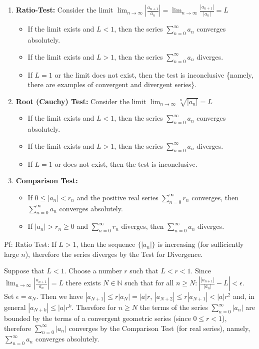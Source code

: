 \documentclass{article}
\begin{document}
\begin{enumerate}
    \item \textbf{Ratio-Test:} Consider the limit $\lim_{n \to \infty} \left| \frac{a_{n+1}}{a_n} \right| = \lim_{n \to \infty} \frac{|a_{n+1}|}{|a_n|} = L$
    \begin{itemize}
        \item If the limit exists and $L < 1$, then the series $\sum_{n=0}^{\infty} a_n$ converges absolutely.
        \item If the limit exists and $L > 1$, then the series $\sum_{n=0}^{\infty} a_n$ diverges.
        \item If $L = 1$ or the limit does not exist, then the test is inconclusive \{namely, there are examples of convergent and divergent series\}.
    \end{itemize}
    \item \textbf{Root (Cauchy) Test:} Consider the limit $\lim_{n \to \infty} \sqrt[n]{|a_n|} = L$
    \begin{itemize}
        \item If the limit exists and $L < 1$, then the series $\sum_{n=0}^{\infty} a_n$ converges absolutely.
        \item If the limit exists and $L > 1$, then the series $\sum_{n=0}^{\infty} a_n$ diverges.
        \item If $L = 1$ or does not exist, then the test is inconclusive.
    \end{itemize}
    \item \textbf{Comparison Test:}
    \begin{itemize}
        \item If $0 \leq |a_n| < r_n$ and the positive real series $\sum_{n=0}^{\infty} r_n$ converges, then $\sum_{n=0}^{\infty} a_n$ converges absolutely.
        \item If $|a_n| > r_n \geq 0$ and $\sum_{n=0}^{\infty} r_n$ diverges, then $\sum_{n=0}^{\infty} a_n$ diverges.
    \end{itemize}

\end{enumerate}

Pf: Ratio Test: If $L > 1$, then the sequence $\{|a_n|\}$ is increasing (for sufficiently large $n$), therefore the series diverges by the Test for Divergence.

Suppose that $L < 1$. Choose a number $r$ such that $L < r < 1$. Since $\lim_{n \to \infty} \left| \frac{a_{n+1}}{a_n} \right| = L$ there exists $N \in \mathbb{N}$ such that for all $n \geq N: \left| \frac{|a_{n+1}|}{|a_n|} - L \right| < \epsilon$. Set $\epsilon = a_N$. Then we have $|a_{N+1}| \leq r|a_N| = |a|r$, $|a_{N+2}| \leq r|a_{N+1}| < |a|r^2$ and, in general $|a_{N+k}| \leq |a|r^k$. Therefore for $n \geq N$ the terms of the series $\sum_{n=0}^{\infty} |a_n|$ are bounded by the terms of a convergent geometric series (since $0 \leq r < 1$), therefore $\sum_{n=0}^{\infty} |a_n|$ converges by the Comparison Test (for real series), namely, $\sum_{n=0}^{\infty} a_n$ converges absolutely.
\end{document}
